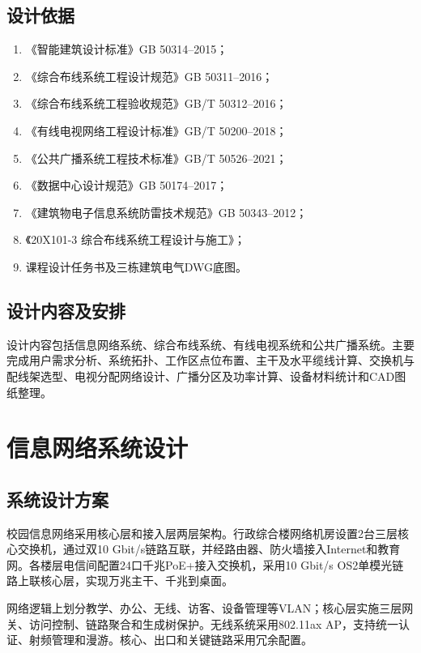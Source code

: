 \documentclass[UTF8,zihao=-4,openany]{ctexrep}
\begin{document}
\section{设计依据}
\begin{enumerate}
  \item 《智能建筑设计标准》GB 50314--2015；
  \item 《综合布线系统工程设计规范》GB 50311--2016；
  \item 《综合布线系统工程验收规范》GB/T 50312--2016；
  \item 《有线电视网络工程设计标准》GB/T 50200--2018；
  \item 《公共广播系统工程技术标准》GB/T 50526--2021；
  \item 《数据中心设计规范》GB 50174--2017；
  \item 《建筑物电子信息系统防雷技术规范》GB 50343--2012；
  \item 《20X101-3 综合布线系统工程设计与施工》；
  \item 课程设计任务书及三栋建筑电气DWG底图。
\end{enumerate}

\section{设计内容及安排}
设计内容包括信息网络系统、综合布线系统、有线电视系统和公共广播系统。主要完成用户需求分析、系统拓扑、工作区点位布置、主干及水平缆线计算、交换机与配线架选型、电视分配网络设计、广播分区及功率计算、设备材料统计和CAD图纸整理。

\chapter{信息网络系统设计}
\section{系统设计方案}
校园信息网络采用核心层和接入层两层架构。行政综合楼网络机房设置2台三层核心交换机，通过双10 Gbit/s链路互联，并经路由器、防火墙接入Internet和教育网。各楼层电信间配置24口千兆PoE+接入交换机，采用10 Gbit/s OS2单模光链路上联核心层，实现万兆主干、千兆到桌面。

网络逻辑上划分教学、办公、无线、访客、设备管理等VLAN；核心层实施三层网关、访问控制、链路聚合和生成树保护。无线系统采用802.11ax AP，支持统一认证、射频管理和漫游。核心、出口和关键链路采用冗余配置。
\end{document}
